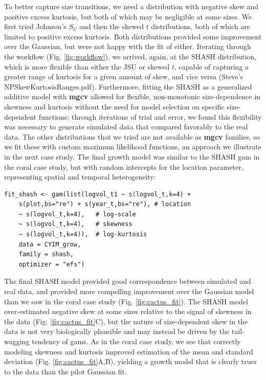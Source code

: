 \documentclass[12pt]{article}
\begin{document}
To better capture size transitions, we need a distribution with negative skew and positive excess kurtosis, but both of which may be negligible at some sizes.
We first tried Johnson's $S_{U}$ and then the skewed $t$ distributions, both of which are limited to positive excess kurtosis.
Both distributions provided some improvement over the Gaussian, but were not happy with the fit of either. 
Iterating through the workflow (Fig. \ref{fig:workflow}), we arrived, again, at the SHASH distribution, which is more flexible than either the JSU or skewed $t$, capable of capturing a greater range of kurtosis for a given amount of skew, and vice versa (Steve's NPSkewKurtosisRanges.pdf). 
Furthermore, fitting the SHASH as a generalized additive model with \textbf{mgcv} allowed for flexible, non-monotonic size-dependence in skewness and kurtosis without the need for model selection on specific size-dependent functions; through iterations of trial and error, we found this flexibility was necessary to generate simulated data that compared favorably to the real data. 
The other distributions that we tried are not available as \textbf{mgcv} families, so we fit these with custom maximum likelihood functions, an approach we illustrate in the next case study.
The final growth model was similar to the SHASH gam in the coral case study, but with random intercepts for the location parameter, representing spatial and temporal heterogeneity:
\begin{lstlisting}
fit_shash <- gam(list(logvol_t1 ~ s(logvol_t,k=4) + 
    s(plot,bs="re") + s(year_t,bs="re"), # location 
    ~ s(logvol_t,k=4),   # log-scale
    ~ s(logvol_t,k=4),   # skewness
    ~ s(logvol_t,k=4)),  # log-kurtosis
    data = CYIM_grow, 
    family = shash,  
    optimizer = "efs")
\end{lstlisting}

The final SHASH model provided good correspondence between simulated and real data, and provided more compelling improvement over the Gaussian model than we saw in the coral case study (Fig. \ref{fig:cactus_fit}). 
The SHASH model over-estimated negative skew at some sizes relative to the signal of skewness in the data (Fig. \ref{fig:cactus_fit}C), but the nature of size-dependent skew in the data is not very biologically plausible and may instead be driven by the tail-wagging tendency of gams. 
As in the coral case study, we see that correctly modeling skewness and kurtosis improved estimation of the mean and standard deviation (Fig. \ref{fig:cactus_fit}A,B), yielding a growth model that is clearly truer to the data than the pilot Gaussian fit. 
\end{document}
